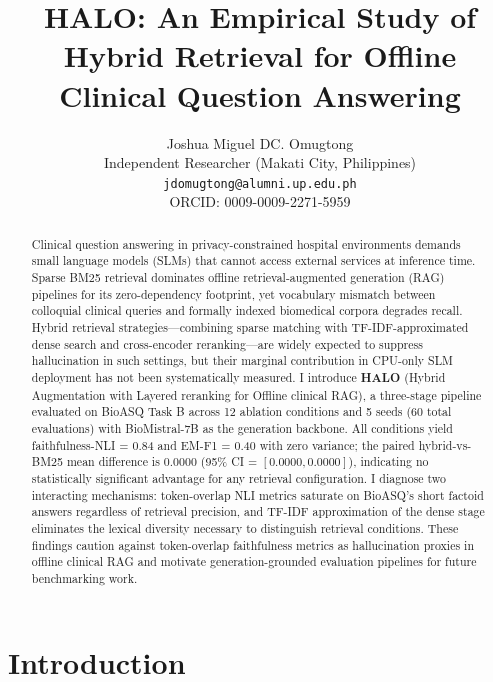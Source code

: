 \documentclass{article}
\title{HALO: An Empirical Study of Hybrid Retrieval for Offline Clinical Question Answering}
\author{
Joshua Miguel DC. Omugtong \\
Independent Researcher (Makati City, Philippines) \\
\texttt{jdomugtong@alumni.up.edu.ph} \\
ORCID: 0009-0009-2271-5959
}
\begin{document}
\maketitle

\begin{abstract}
Clinical question answering in privacy-constrained hospital environments demands small language models (SLMs) that cannot access external services at inference time. Sparse BM25 retrieval dominates offline retrieval-augmented generation (RAG) pipelines for its zero-dependency footprint, yet vocabulary mismatch between colloquial clinical queries and formally indexed biomedical corpora degrades recall. Hybrid retrieval strategies---combining sparse matching with TF-IDF-approximated dense search and cross-encoder reranking---are widely expected to suppress hallucination in such settings, but their marginal contribution in CPU-only SLM deployment has not been systematically measured. I introduce \textbf{HALO} (Hybrid Augmentation with Layered reranking for Offline clinical RAG), a three-stage pipeline evaluated on BioASQ Task B across 12 ablation conditions and 5 seeds (60 total evaluations) with BioMistral-7B as the generation backbone. All conditions yield faithfulness-NLI = 0.84 and EM-F1 = 0.40 with zero variance; the paired hybrid-vs-BM25 mean difference is 0.0000 (95\% CI = $[0.0000, 0.0000]$), indicating no statistically significant advantage for any retrieval configuration. I diagnose two interacting mechanisms: token-overlap NLI metrics saturate on BioASQ's short factoid answers regardless of retrieval precision, and TF-IDF approximation of the dense stage eliminates the lexical diversity necessary to distinguish retrieval conditions. These findings caution against token-overlap faithfulness metrics as hallucination proxies in offline clinical RAG and motivate generation-grounded evaluation pipelines for future benchmarking work.

\end{abstract}

\section{Introduction}

\label{sec:introduction}
\end{document}
